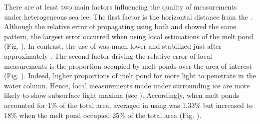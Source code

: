 There are at least two main factors influencing the quality of \DIFdelbegin {}\DIFdelend \DIFaddbegin {}\DIFaddend measurements under heterogeneous sea ice. The first factor is the horizontal distance from the \DIFdelbegin {}\DIFdelend \DIFaddbegin {}\DIFaddend . Although the relative error of propagating \edzero{} using both \ked{} and \klu{} showed the same pattern, the largest error occurred when using local estimations of \ked{} \DIFdelbegin {}\DIFdelend \DIFaddbegin {} \DIFdelbegin {}\DIFdelend \DIFaddbegin {}\DIFaddend the melt pond \DIFaddbegin {}\DIFaddend (Fig. \DIFdelbegin {}\DIFdelend \DIFaddbegin {}\DIFaddend ). In contrast, \DIFdelbegin {}\DIFdelend \DIFaddbegin {}\DIFaddend the use of \klu{} was much lower and stabilized just after approximately \DIFdelbegin {}\DIFdelend \DIFaddbegin {}\DIFaddend . The second factor driving the relative error of local measurements is the proportion occupied by melt ponds over the area of interest (Fig. \DIFdelbegin {}\DIFdelend \DIFaddbegin {}\DIFaddend ). Indeed, higher proportions of melt pond \DIFdelbegin {}\DIFdelend \DIFaddbegin {}\DIFaddend for more light to penetrate in the water column. Hence, local measurements made under surrounding ice are more likely to show subsurface light maxima (see \citet{Frey2011}). Accordingly, when melt ponds accounted for 1\% of the total area, averaged \DIFdelbegin {}\DIFdelend \DIFaddbegin {}\DIFaddend in \edz{} using \klu{} was 1.33\% but increased to 18\% when the melt pond occupied 25\% of the total area (Fig. \DIFdelbegin {}\DIFdelend \DIFaddbegin {}\DIFaddend ).